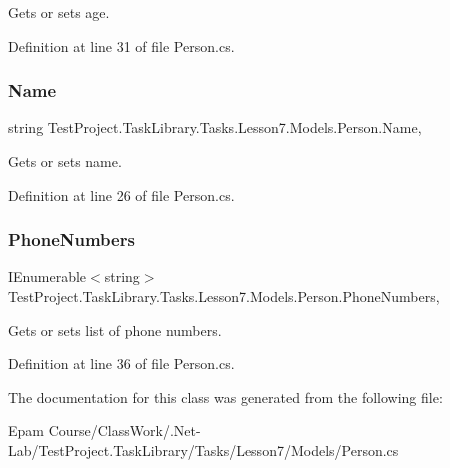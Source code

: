 Gets or sets age. 



Definition at line 31 of file Person.\+cs.

\mbox{\label{class_test_project_1_1_task_library_1_1_tasks_1_1_lesson7_1_1_models_1_1_person_a34850f28fb4b38896ace9fc9dc8e4351}} 
\subsubsection{\texorpdfstring{Name}{Name}}
{\footnotesize\ttfamily string Test\+Project.\+Task\+Library.\+Tasks.\+Lesson7.\+Models.\+Person.\+Name\hspace{0.3cm}{\ttfamily [get]}, {\ttfamily [set]}}



Gets or sets name. 



Definition at line 26 of file Person.\+cs.

\mbox{\label{class_test_project_1_1_task_library_1_1_tasks_1_1_lesson7_1_1_models_1_1_person_a582085bdb7689baadf6883c9e8148307}} 
\subsubsection{\texorpdfstring{PhoneNumbers}{PhoneNumbers}}
{\footnotesize\ttfamily I\+Enumerable$<$string$>$ Test\+Project.\+Task\+Library.\+Tasks.\+Lesson7.\+Models.\+Person.\+Phone\+Numbers\hspace{0.3cm}{\ttfamily [get]}, {\ttfamily [set]}}



Gets or sets list of phone numbers. 



Definition at line 36 of file Person.\+cs.



The documentation for this class was generated from the following file\+:\begin{DoxyCompactItemize}
\item 
Epam Course/\+Class\+Work/.\+Net-\/\+Lab/\+Test\+Project.\+Task\+Library/\+Tasks/\+Lesson7/\+Models/Person.\+cs\end{DoxyCompactItemize}
